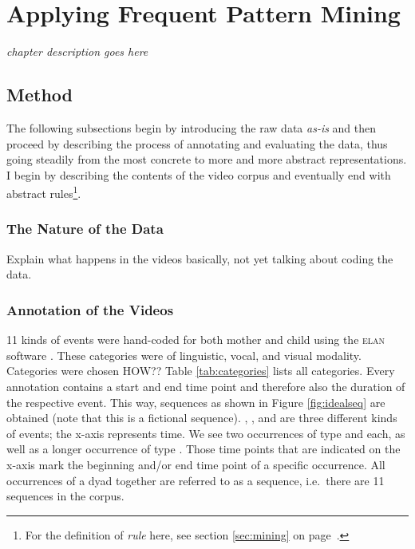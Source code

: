 
\chapter{Applying Frequent Pattern Mining}
\emph{chapter description goes here}

\section{Method}
The following subsections begin by introducing the raw data \emph{as-is} and then proceed by describing the process of annotating and evaluating the data, thus going steadily from the most concrete to more and more abstract representations. I begin by describing the contents of the video corpus and eventually end with abstract rules\footnote{For the definition of \emph{rule} here, see section \ref{sec:mining} on page~\pageref{sec:mining}.}.

\subsection{The Nature of the Data}
Explain what happens in the videos basically, not yet talking about coding the data.

\subsection{Annotation of the Videos}
11 kinds of events were hand-coded for both mother and child using the \textsc{elan} software \citep{wittenburg06}. These categories were of linguistic, vocal, and visual modality. Categories were chosen HOW??  %
Table \ref{tab:categories} lists all categories. Every annotation contains a start and end time point and therefore also the duration of the respective event. This way, sequences as shown in Figure \ref{fig:idealseq} are obtained (note that this is a fictional sequence). , , and  are three different kinds of events; the x-axis represents time. We see two occurrences of type  and  each, as well as a longer occurrence of type . Those time points that are indicated on the x-axis mark the beginning and/or end time point of a specific occurrence. All occurrences of a dyad together are referred to as a sequence, i.e.\ there are 11 sequences in the corpus.




